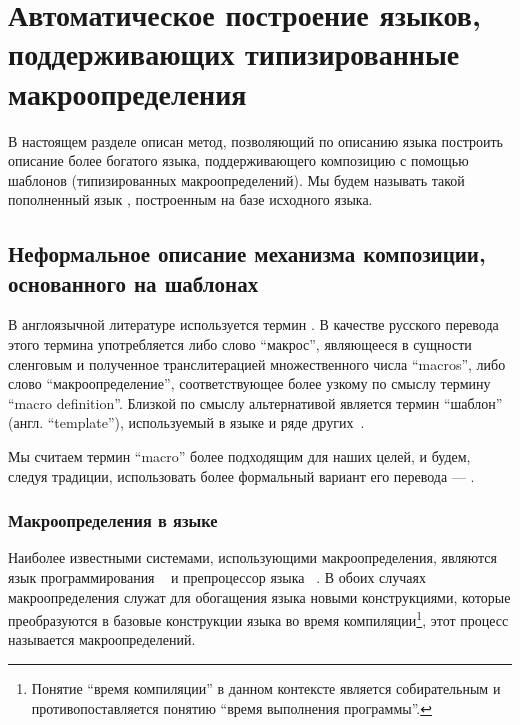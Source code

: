\chapter{Автоматическое построение языков, поддерживающих типизированные макроопределения}

В настоящем разделе описан метод, позволяющий по описанию языка построить описание более богатого языка, поддерживающего композицию с помощью шаблонов (типизированных макроопределений). Мы будем называть такой пополненный язык , построенным на базе исходного языка.

\section{Неформальное описание механизма композиции, основанного на шаблонах}

\begin{Note}[О терминологии]
В англоязычной литературе используется термин  \cite{MacroML,Cpp,Nemerle}. 
В качестве русского перевода этого термина употребляется либо слово ``макрос'', являющееся в сущности сленговым и полученное транслитерацией множественного числа ``macros'', либо слово ``макроопределение'', соответствующее более узкому по смыслу термину ``macro definition''. 
Близкой по смыслу альтернативой является термин ``шаблон'' (англ. ``template''), используемый в языке 
\cite{C++} 
и ряде других~\cite{HTMP,Velocity,UML}. 

Мы считаем термин ``macro'' более подходящим для наших целей, и будем, следуя традиции, использовать более формальный вариант его перевода --- .
\end{Note}

\subsection{Макроопределения в языке }

Наиболее известными системами, использующими макроопределения, являются язык программирования ~\cite{Lisp} и препроцессор языка ~\cite{C, Cpp}. В обоих случаях макроопределения служат для обогащения языка новыми конструкциями, которые преобразуются в базовые конструкции языка во время компиляции\footnote{Понятие ``время компиляции'' в данном контексте является собирательным и противопоставляется понятию ``время выполнения программы''.}, этот процесс называется  макроопределений.

